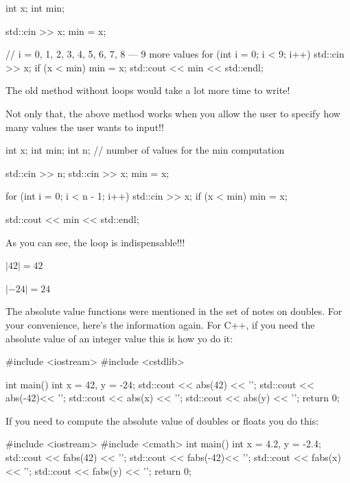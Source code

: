 \begin{console}
int x;
int min;

std::cin >> x;
min = x;

// i = 0, 1, 2, 3, 4, 5, 6, 7, 8 --- 9 more values
for (int i = 0; i < 9; i++)
{   
    std::cin >> x;
    if (x < min)
    {
        min = x;
    }
}
std::cout << min << std::endl;
\end{console}

The old method without loops would take a lot more time to write!

Not only that, the above method works when you allow the user to specify
how many values the user wants to input!!

\begin{console}
int x;
int min;
int n; // number of values for the min computation

std::cin >> n;
std::cin >> x;
min = x;

for (int i = 0; i < n - 1; i++)
{   
    std::cin >> x;
    if (x < min)
    {
        min = x;
    }
}

std::cout << min << std::endl;
\end{console}

As you can see, the loop is indispensable!!!
\begin{center}
$|42| = 42$

$|-24| = 24$
\end{center}

The absolute value functions were mentioned in the set of notes on
doubles. For your convenience, here's the information
again. For C++, if you need the absolute value of an integer value this
is how yo do it:
\begin{console}
#include <iostream>
#include <cstdlib>

int main()
{   
    int x = 42, y = -24;
    std::cout << abs(42) << '\n';
    std::cout << abs(-42)<< '\n'; 
    std::cout << abs(x) << '\n'; 
    std::cout << abs(y) << '\n';
    return 0;
}
\end{console}

If you need to compute the absolute value of doubles or floats you do
this:
\begin{console}
#include <iostream>
#include <cmath>
int main()
{   
    int x = 4.2, y = -2.4;
    std::cout << fabs(42) << '\n';
    std::cout << fabs(-42)<< '\n'; 
    std::cout << fabs(x) << '\n'; 
    std::cout << fabs(y) << '\n';
}
return 0;
\end{console}


